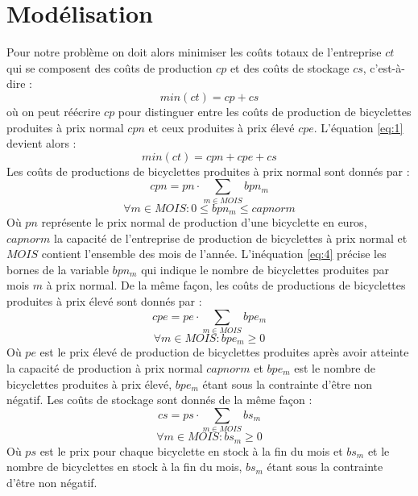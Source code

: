 \documentclass[11pt,a4paper]{report}
\begin{document}
\section*{Modélisation}
Pour notre problème on doit alors minimiser les coûts totaux de l'entreprise $ct$ qui se composent des coûts de production $cp$ et des coûts de stockage $cs$, c'est-à-dire : 
\begin{equation}\label{eq:1}
min(ct) = cp + cs
\end{equation} 
où on peut réécrire $cp$ pour distinguer entre les coûts de production de bicyclettes produites à prix normal $cpn$ et ceux produites à prix élevé $cpe$. L'équation \eqref{eq:1} devient alors : 
\begin{equation}\label{eq:2}
min(ct) = cpn + cpe + cs
\end{equation}
Les coûts de productions de bicyclettes produites à prix normal sont donnés par :
\begin{equation}\label{eq:3}
cpn = pn\cdot\sum_{ m \in MOIS} bpn_{m}
\end{equation}
\begin{equation}\label{eq:4}
\forall m \in MOIS : 0 \leq bpn_{m} \leq capnorm
\end{equation}
Où $pn$ représente le prix normal de production d'une bicyclette en euros, $capnorm$ la capacité de l'entreprise  de production de bicyclettes à prix normal et  $MOIS$ contient l'ensemble des mois de l'année. \newline L'inéquation \eqref{eq:4} précise les bornes de la variable $bpn_{m}$ qui indique le nombre de bicyclettes produites par mois $m$ à prix normal.\newline
De la même façon, les coûts de productions de bicyclettes produites à prix élevé sont donnés par :
\begin{equation}\label{eq:5}
cpe=pe\cdot \sum_{m \in MOIS} bpe_{m}
\end{equation}
\begin{equation}\label{eq:6}
\forall m \in MOIS :  bpe_{m} \geq 0
\end{equation}
Où $pe$ est le prix élevé de production de bicyclettes produites après avoir atteinte la capacité de production à prix normal $capnorm$ et $bpe_{m}$ est le nombre de bicyclettes produites à prix élevé, $bpe_{m}$ étant sous la contrainte d'être non négatif.\newline
Les coûts de stockage sont donnés de la même façon :
\begin{equation}\label{eq:7}
cs=ps\cdot \sum_{m \in MOIS} bs_{m}
\end{equation}
\begin{equation}\label{eq:8}
\forall m \in MOIS :  bs_{m} \geq 0
\end{equation}
Où $ps$ est  le prix pour chaque bicyclette en stock à la fin du mois et $bs_{m}$ et le nombre de bicyclettes en stock à la fin du mois,  $bs_{m}$ étant sous la contrainte d'être non négatif.
\end{document}
